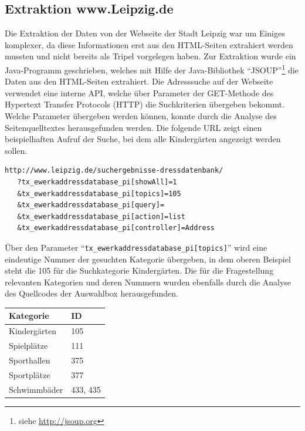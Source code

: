 \documentclass[parskip]{scrartcl}
\begin{document}
\subsection{Extraktion www.Leipzig.de}\label{extract_leipzig}
Die Extraktion der Daten von der Webseite der Stadt Leipzig war um 
Einiges komplexer, da diese Informationen erst aus den HTML-Seiten extrahiert werden mussten und nicht bereits als Tripel vorgelegen haben.
Zur Extraktion wurde ein Java-Programm geschrieben, welches mit Hilfe der Java-Bibliothek "`JSOUP"'\footnote{siehe \url{http://jsoup.org}} die Daten aus den HTML-Seiten extrahiert. Die Adresssuche auf der Webseite verwendet eine interne API, welche über Parameter der GET-Methode des Hypertext Transfer Protocols (HTTP) die Suchkriterien übergeben bekommt. Welche Parameter übergeben werden können, konnte durch die Analyse des Seitenquelltextes herausgefunden werden. Die folgende URL zeigt einen beispielhaften Aufruf der Suche, bei dem alle Kindergärten angezeigt werden sollen.

\begin{lstlisting}
http://www.leipzig.de/suchergebnisse-dressdatenbank/
   ?tx_ewerkaddressdatabase_pi[showAll]=1
   &tx_ewerkaddressdatabase_pi[topics]=105
   &tx_ewerkaddressdatabase_pi[query]=
   &tx_ewerkaddressdatabase_pi[action]=list
   &tx_ewerkaddressdatabase_pi[controller]=Address
\end{lstlisting}

Über den Parameter "`\texttt{tx\_ewerkaddressdatabase\_pi[topics]}"' wird eine eindeutige Nummer der gesuchten Kategorie übergeben, in dem oberen Beispiel steht die 105 für die Suchkategorie Kindergärten. Die für die Fragestellung relevanten Kategorien und deren Nummern wurden ebenfalls durch die Analyse des Quellcodes der Auswahlbox herausgefunden.

\begin{table}[h]
\label{my-label}
\begin{tabular}{@{}ll@{}}
\toprule
{\bf Kategorie} & {\bf ID} \\ \midrule
Kindergärten    & 105      \\
Spielplätze     & 111      \\
Sporthallen     & 375      \\
Sportplätze     & 377      \\
Schwimmbäder    & 433, 435 \\ \bottomrule
\end{tabular}
\end{table}
\end{document}
